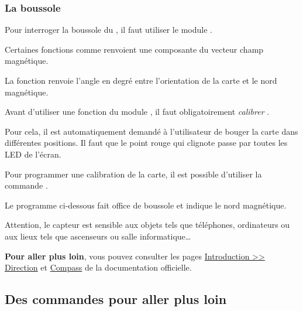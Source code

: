 \subsubsection{La boussole}

Pour interroger la boussole du \mb, il faut utiliser le module .\par 
Certaines fonctions comme  renvoient une composante du vecteur champ magnétique.\par 
La fonction renvoie l'angle en degré entre l'orientation de la carte \mb et le nord magnétique.

\begin{remarque}
    Avant d'utiliser une fonction du module , il faut obligatoirement \emph{calibrer} \mb.
    
    Pour cela, il est automatiquement demandé à l'utilisateur de bouger la carte dans différentes positions. Il faut que le point rouge qui clignote passe par toutes les LED de l'écran.
    
    Pour programmer une calibration de la carte, il est possible d'utiliser la commande .
\end{remarque}


\begin{methode}
Le programme ci-dessous fait office de boussole et indique le nord magnétique.

Attention, le capteur est sensible aux objets tels que téléphones, ordinateurs ou aux lieux tels que ascenseurs ou salle informatique\ldots

\end{methode}

\begin{remarque}
\textbf{Pour aller plus loin}, vous pouvez consulter les pages  \href{https://microbit-micropython.readthedocs.io/fr/latest/tutorials/direction.html}{Introduction >> Direction} et \href{https://microbit-micropython.readthedocs.io/fr/latest/compass.html}{Compass} de la documentation officielle.
\end{remarque}





\newpage

\subsection{Des commandes pour aller plus loin}


